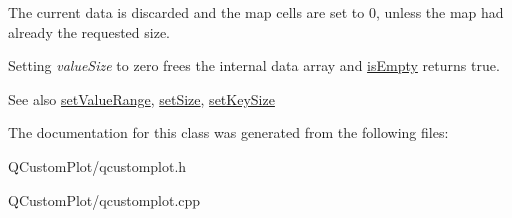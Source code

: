 The current data is discarded and the map cells are set to 0, unless the map had already the requested size.

Setting {\itshape value\+Size} to zero frees the internal data array and \mbox{\hyperlink{class_q_c_p_color_map_data_aea88cc75a76ca571acf29b2ba8ac970d}{is\+Empty}} returns true.

\begin{DoxySeeAlso}{See also}
\mbox{\hyperlink{class_q_c_p_color_map_data_ada1b2680ba96a5f4175b6d341cf75d23}{set\+Value\+Range}}, \mbox{\hyperlink{class_q_c_p_color_map_data_a0d9ff35c299d0478b682bfbcdd9c097e}{set\+Size}}, \mbox{\hyperlink{class_q_c_p_color_map_data_ac7ef70e383aface34b44dbde49234b6b}{set\+Key\+Size}} 
\end{DoxySeeAlso}


The documentation for this class was generated from the following files\+:\begin{DoxyCompactItemize}
\item 
Q\+Custom\+Plot/qcustomplot.\+h\item 
Q\+Custom\+Plot/qcustomplot.\+cpp\end{DoxyCompactItemize}
